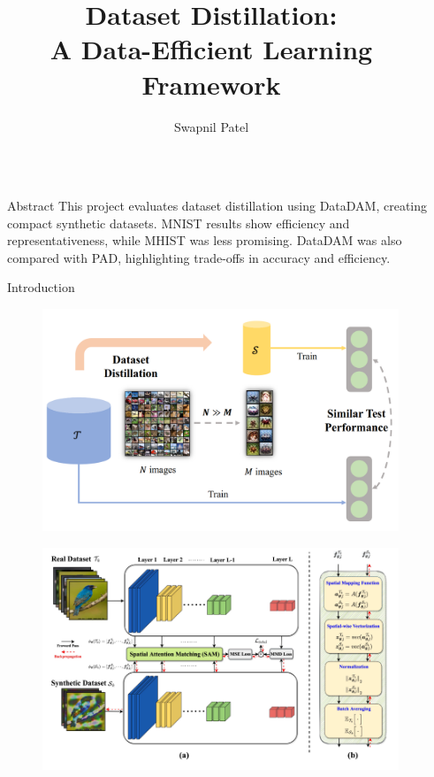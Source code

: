 \documentclass[final]{beamer}
\title{Dataset Distillation: \\ A Data-Efficient Learning Framework}
\author{Swapnil Patel}
\institute[shortinst]{Electrical \& Computer Engineering, University of Toronto}
\newlength{\sepwidth}
\newlength{\colwidth}
\newcommand{\separatorcolumn}{\begin{column}{\sepwidth}\end{column}}
\begin{document}
\begin{columns}
	\separatorcolumn
	\begin{column}{\colwidth}
		\begin{block}{Abstract}
			This project evaluates dataset distillation using DataDAM, creating compact synthetic datasets. MNIST results show efficiency and representativeness, while MHIST was less promising. DataDAM was also compared with PAD, highlighting trade-offs in accuracy and efficiency.
		\end{block}
		\begin{block}{Introduction}
			\begin{figure}[ht]
			\centering
			\begin{minipage}{0.49\textwidth}
				\centering
				\includegraphics[width=\textwidth]{figures/dataD.png}
				\label{fig:datad}
			\end{minipage}
			\hfill
			\begin{minipage}{0.49\textwidth}
				\centering
				\includegraphics[width=\textwidth]{../report/figures/datadam.png}
				\label{fig:dataDAM}
			\end{minipage}
		\end{figure}
		

\end{block}
\end{column}
\end{columns}
\end{document}
